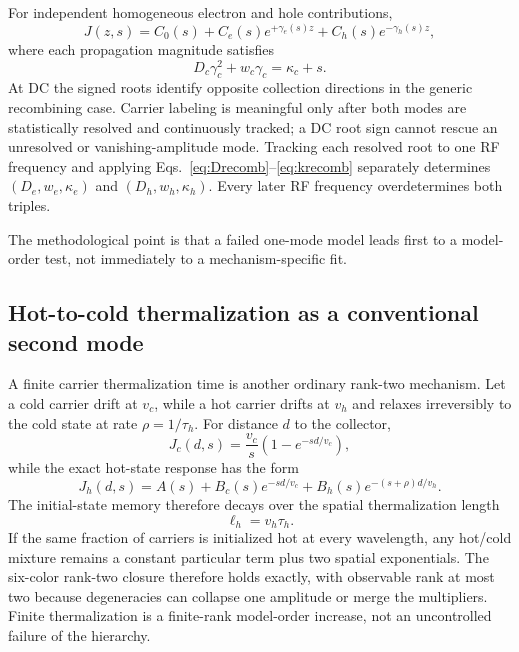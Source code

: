 \documentclass[11pt]{article}
\begin{document}
For independent homogeneous electron and hole contributions,
\begin{equation}
J(z,s)=C_0(s)+C_e(s)e^{+\gamma_e(s)z}+C_h(s)e^{-\gamma_h(s)z},
\end{equation}
where each propagation magnitude satisfies
\begin{equation}
D_c\gamma_c^2+w_c\gamma_c=\kappa_c+s.
\end{equation}
At DC the signed roots identify opposite collection directions in the generic recombining case. Carrier labeling is meaningful only after both modes are statistically resolved and continuously tracked; a DC root sign cannot rescue an unresolved or vanishing-amplitude mode. Tracking each resolved root to one RF frequency and applying Eqs.~\eqref{eq:Drecomb}--\eqref{eq:krecomb} separately determines $(D_e,w_e,\kappa_e)$ and $(D_h,w_h,\kappa_h)$. Every later RF frequency overdetermines both triples.

The methodological point is that a failed one-mode model leads first to a model-order test, not immediately to a mechanism-specific fit.

\subsection{Hot-to-cold thermalization as a conventional second mode}

A finite carrier thermalization time is another ordinary rank-two mechanism. Let a cold carrier drift at $v_c$, while a hot carrier drifts at $v_h$ and relaxes irreversibly to the cold state at rate $\rho=1/\tau_h$. For distance $d$ to the collector,
\begin{equation}
J_c(d,s)=\frac{v_c}{s}\left(1-e^{-sd/v_c}\right),
\end{equation}
while the exact hot-state response has the form
\begin{equation}
\boxed{J_h(d,s)=A(s)+B_c(s)e^{-sd/v_c}+B_h(s)e^{-(s+\rho)d/v_h}.}
\label{eq:hot_two_mode}
\end{equation}
The initial-state memory therefore decays over the spatial thermalization length
\begin{equation}
\boxed{\ell_h=v_h\tau_h.}
\end{equation}
If the same fraction of carriers is initialized hot at every wavelength, any hot/cold mixture remains a constant particular term plus two spatial exponentials. The six-color rank-two closure therefore holds exactly, with observable rank at most two because degeneracies can collapse one amplitude or merge the multipliers. Finite thermalization is a finite-rank model-order increase, not an uncontrolled failure of the hierarchy.
\end{document}

